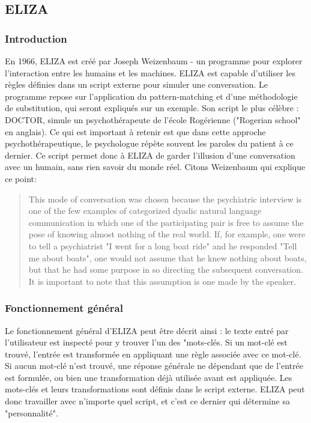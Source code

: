 \documentclass[11pt, a4paper]{report}
\begin{document}
    \subsection{ELIZA}
    \cite{wikipedia-eliza}
    \cite{eliza-original}
    \cite{eliza-gpt}
    \cite{weizenbaum-book}
    \cite{weizenbaum-pic}
      \subsubsection{Introduction}
En 1966, ELIZA est créé par Joseph Weizenbaum - un programme pour explorer l'interaction entre les humains et 
les machines. ELIZA est capable d'utiliser les règles définies dans un script externe pour 
simuler une conversation. Le programme repose sur l'application du pattern-matching et d'une 
méthodologie de substitution, qui seront expliqués sur un exemple.
Son script le plus célèbre : DOCTOR, simule un psychothérapeute de l'école Rogérienne
("Rogerian school" en anglais). Ce qui est important à retenir est que dans cette approche 
psychothérapeutique, le psychologue répète souvent les paroles du patient à ce dernier. 
Ce script permet donc à ELIZA de garder l'illusion d'une conversation avec un humain, 
sans rien savoir du monde réel. Citons Weizenbaum qui explique ce point:

\begin{quote}
  This mode of conversation was chosen because the psychiatric interview is one of the 
  few examples of categorized dyadic natural 
  language communication in which one of the participating pair is free to assume the pose 
  of knowing almost nothing of the real world. If, for example, one were to tell a 
  psychiatrist "I went for a long boat ride" and he responded "Tell me about boats", 
  one would not assume that he knew nothing about boats, but that he had some purpose 
  in so directing the subsequent conversation. It is important to note that this 
  assumption is one made by the speaker. \cite[L'article original de Joseph Weizenbaum
  sur ELIZA]{eliza-original}
\end{quote}

      \subsubsection{Fonctionnement général}
Le fonctionnement général d'ELIZA peut être décrit ainsi : le texte entré par l'utilisateur 
est inspecté pour y trouver l'un des "mots-clés. Si un mot-clé est trouvé, l'entrée est transformée 
en appliquant une règle associée avec ce mot-clé. Si aucun mot-clé n'est trouvé, une réponse générale 
ne dépendant que de l'entrée est formulée, ou bien une transformation déjà utilisée 
avant est appliquée. 
Les mots-clés et leurs transformations sont définis dans le script externe. 
ELIZA peut donc travailler 
avec n'importe quel script, et c'est ce dernier qui détermine sa "personnalité". 
\end{document}
